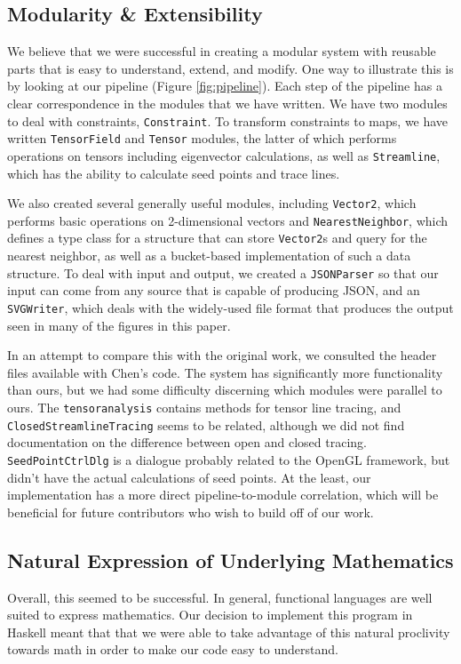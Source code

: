 \documentclass[twocolumn]{article}
\begin{document}
\subsection{Modularity \& Extensibility}
We believe that we were successful in creating a modular system with reusable
parts that is easy to understand, extend, and modify. One way to illustrate
this is by looking at our pipeline (Figure \ref{fig:pipeline}). Each step of
the pipeline has a clear correspondence in the modules that we have written.
We have two modules to deal with constraints, \texttt{Constraint}. To transform
constraints to maps, we have written \texttt{TensorField} and \texttt{Tensor}
modules, the latter of which performs operations on tensors including
eigenvector calculations, as well as \texttt{Streamline}, which has the ability
to calculate seed points and trace lines.

We also created several generally useful modules, including \texttt{Vector2},
which performs basic operations on 2-dimensional vectors and
\texttt{NearestNeighbor}, which defines a type class for a structure that can
store \texttt{Vector2}s and query for the nearest neighbor, as well as a
bucket-based implementation of such a data structure. To deal with input and
output, we created a \texttt{JSONParser} so that our input can come from any
source that is capable of producing JSON, and an \texttt{SVGWriter}, which
deals with the widely-used file format that produces the output seen in many of
the figures in this paper.

In an attempt to compare this with the original work, we consulted the header
files available with Chen’s code. The system has significantly more
functionality than ours, but we had some difficulty discerning which modules
were parallel to ours. The \texttt{tensoranalysis} contains methods for tensor
line tracing, and \texttt{ClosedStreamlineTracing} seems to be related,
although we did not find documentation on the difference between open and
closed tracing. \texttt{SeedPointCtrlDlg} is a dialogue probably related to the
OpenGL framework, but didn’t have the actual calculations of seed points. At
the least, our implementation has a more direct pipeline-to-module correlation,
which will be beneficial for future contributors who wish to build off of our
work.

\subsection{Natural Expression of Underlying Mathematics}
Overall, this seemed to be successful. In general, functional languages are
well suited to express mathematics. Our decision to implement this program in
Haskell meant that that we were able to take advantage of this natural
proclivity towards math in order to make our code easy to understand.
\end{document}
